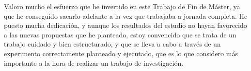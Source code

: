 Valoro mucho el esfuerzo que he invertido en este Trabajo de Fin de Máster, ya que he conseguido sacarlo adelante a la vez que trabajaba a jornada completa. He puesto mucha dedicación, y aunque los resultados del estudio no hayan favorecido a las nuevas propuestas que he planteado, estoy convencido que se trata de un trabajo cuidado y bien estructurado, y que se lleva a cabo a través de un experimento correctamente planteado y ejecutado, que es lo que considero más importante a la hora de realizar un trabajo de investigación.